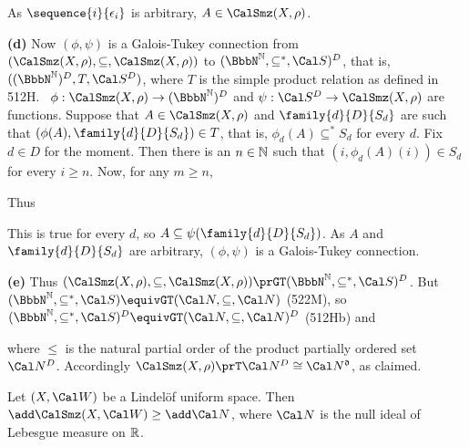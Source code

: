 {

\noindent As $\sequence{i}{\epsilon_i}$ is arbitrary, $A\in\CalSmz(X,\rho)$.\
\Qed

\medskip

{\bf (d)} Now $(\phi,\psi)$ is a Galois-Tukey connection from
$(\CalSmz(X,\rho),\subseteq,\CalSmz(X,\rho))$ to
$(\NN,\penalty-100\subseteq^*\nobreak,\penalty-100\Cal S)^D$, that is,
$((\NN)^D,T,\penalty-100\Cal S^D)$,
where $T$ is the simple product relation as defined in 512H.   \Prf\
$\phi:\CalSmz(X,\rho)\to(\NN)^D$
and $\psi:\Cal S^D\to\CalSmz(X,\rho)$ are functions.   Suppose that
$A\in\CalSmz(X,\rho)$ and $\family{d}{D}{S_d}$ are such that
$(\phi(A),\family{d}{D}{S_d})\in T$, that is,
$\phi_d(A)\subseteq^*S_d$
for every $d$.   Fix $d\in D$ for the moment.   Then there is an
$n\in\Bbb N$ such that $(i,\phi_d(A)(i))\in S_d$ for every $i\ge n$.
Now, for any $m\ge n$,


\noindent Thus

\Centerline{$A\subseteq
\bigcap_{m\in\Bbb N}\bigcup_{i\ge m}\bigcup_{j\in
S_d[\{i\}]}C_{d(i),j)}
=\psi_d(S_d)$.}

\noindent This is true for every $d$, so
$A\subseteq\psi(\family{d}{D}{S_d})$.   As $A$ and
$\family{d}{D}{S_d}$
are arbitrary, $(\phi,\psi)$ is a Galois-Tukey connection.\ \Qed

\medskip

{\bf (e)} Thus
$(\CalSmz(X,\rho),\subseteq,\CalSmz(X,\rho))
\prGT(\NN,\subseteq^*,\Cal S)^D$.   But
$(\NN,\subseteq^*,\Cal S)
\equivGT(\Cal N,\penalty-100\subseteq\nobreak,\penalty-100\Cal N)$ (522M), so
$(\NN,\subseteq^*,\penalty-100\Cal S)^D
\equivGT(\Cal N,\subseteq,\Cal N)^D$ (512Hb) and


\noindent where $\le$ is the natural partial order of the product
partially ordered set $\Cal N^D$.   Accordingly
$\CalSmz(X,\rho)\prT\Cal N^D\cong\Cal N^{\frak d}$, as claimed.
}%

 Let $(X,\Cal W)$ be a Lindel\"of uniform
space.   Then $\add\CalSmz(X,\Cal W)\ge\add\Cal N$,
where $\Cal N$ is the null ideal of Lebesgue measure on $\Bbb R$.

